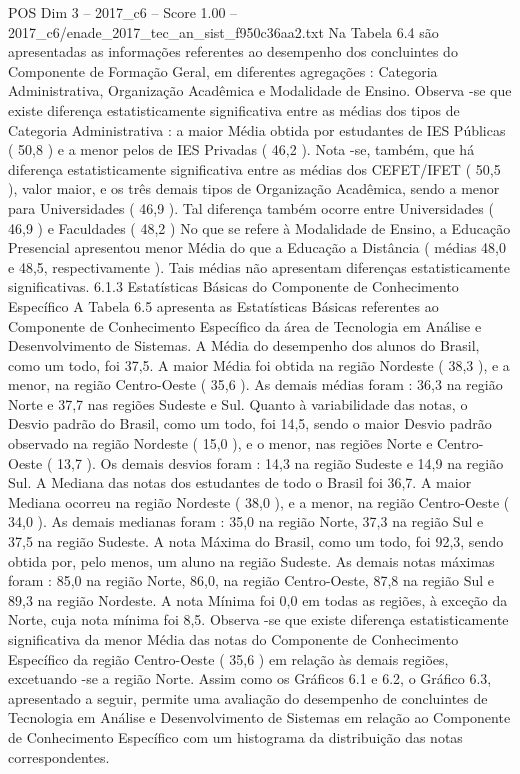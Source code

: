 \begin{textsample}{POS Dim 3 – 2017\_c6 – Score 1.00 – 2017\_c6/enade\_2017\_tec\_an\_sist\_f950c36aa2.txt}
Na Tabela 6.4 são apresentadas as informações referentes ao desempenho dos concluintes do Componente de Formação Geral, em diferentes agregações : Categoria Administrativa, Organização Acadêmica e Modalidade de Ensino.
Observa -se que existe diferença estatisticamente significativa entre as médias dos tipos de Categoria Administrativa : a maior Média obtida por estudantes de IES Públicas ( 50,8 ) e a menor pelos de IES Privadas ( 46,2 ).
Nota -se, também, que há diferença estatisticamente significativa entre as médias dos CEFET/IFET ( 50,5 ), valor maior, e os três demais tipos de Organização Acadêmica, sendo a menor para Universidades ( 46,9 ).
Tal diferença também ocorre entre Universidades ( 46,9 ) e Faculdades ( 48,2 ) No que se refere à Modalidade de Ensino, a Educação Presencial apresentou menor Média do que a Educação a Distância ( médias 48,0 e 48,5, respectivamente ).
Tais médias não apresentam diferenças estatisticamente significativas. 6.1.3 Estatísticas Básicas do Componente de Conhecimento Específico A Tabela 6.5 apresenta as Estatísticas Básicas referentes ao Componente de Conhecimento Específico da área de Tecnologia em Análise e Desenvolvimento de Sistemas.
A Média do desempenho dos alunos do Brasil, como um todo, foi 37,5.
A maior Média foi obtida na região Nordeste ( 38,3 ), e a menor, na região Centro-Oeste ( 35,6 ).
As demais médias foram : 36,3 na região Norte e 37,7 nas regiões Sudeste e Sul.
Quanto à variabilidade das notas, o Desvio padrão do Brasil, como um todo, foi 14,5, sendo o maior Desvio padrão observado na região Nordeste ( 15,0 ), e o menor, nas regiões Norte e Centro-Oeste ( 13,7 ).
Os demais desvios foram : 14,3 na região Sudeste e 14,9 na região Sul.
A Mediana das notas dos estudantes de todo o Brasil foi 36,7.
A maior Mediana ocorreu na região Nordeste ( 38,0 ), e a menor, na região Centro-Oeste ( 34,0 ).
As demais medianas foram : 35,0 na região Norte, 37,3 na região Sul e 37,5 na região Sudeste.
A nota Máxima do Brasil, como um todo, foi 92,3, sendo obtida por, pelo menos, um aluno na região Sudeste.
As demais notas máximas foram : 85,0 na região Norte, 86,0, na região Centro-Oeste, 87,8 na região Sul e 89,3 na região Nordeste.
A nota Mínima foi 0,0 em todas as regiões, à exceção da Norte, cuja nota mínima foi 8,5.
Observa -se que existe diferença estatisticamente significativa da menor Média das notas do Componente de Conhecimento Específico da região Centro-Oeste ( 35,6 ) em relação às demais regiões, excetuando -se a região Norte.
Assim como os Gráficos 6.1 e 6.2, o Gráfico 6.3, apresentado a seguir, permite uma avaliação do desempenho de concluintes de Tecnologia em Análise e Desenvolvimento de Sistemas em relação ao Componente de Conhecimento Específico com um histograma da distribuição das notas correspondentes.

\end{textsample}

